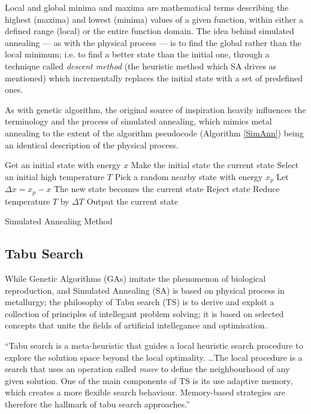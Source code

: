 Local and global minima and maxima are mathematical terms describing the highest (maxima) and lowest (minima) values of a given function, within either a defined range (local) or the entire function domain. The idea behind simulated annealing --- as with the physical process --- is to find the global rather than the local minimum; i.e. to find a better state than the initial one, through a technique called \emph{descent method} (the heuristic method which SA drives as mentioned)  which incrementally replaces the initial state with a set of predefined ones.

As with genetic algorithm, the original source of inspiration heavily influences the terminology and the process of simulated annealing, which mimics metal annealing to the extent of the algorithm pseudocode (Algorithm \ref{SimAnn}) being an identical description of the physical process.

\begin{algorithm}
\begin{algorithmic}[1]
\State Get an initial state with energy $x$
\State Make the initial state the current state
\State Select an initial high temperature $T$
		\State Pick a random nearby state with energy $x_p$
		\State Let $\Delta x = x_p - x$
			\State The new state becomes the current state
		\Else
			\State Reject state
		\EndIf
	\EndWhile
	\State Reduce temperature $T$ by $\Delta T$
\EndWhile
\State Output the current state
\end{algorithmic}
\caption{Simulated Annealing Method \cite{lam88}}
\label{SimAnn}
\end{algorithm}

\clearpage
\subsection{Tabu Search}

While Genetic Algorithms (GAs) imitate the phenomenon of biological reproduction, and Simulated Annealing (SA) is based on physical process in metallurgy; the philosophy of Tabu search (TS) is to derive and exploit a collection of principles of intellegant problem solving; it is based on selected concepts that unite the fields of artificial intellegance and optimisation. \cite{glover97}

``Tabu search is a meta-heuristic that guides a local heuristic search procedure to explore the solution space beyond the local optimality. \ldots The local procedure is a search that uses an operation called \emph{move} to define the neighbourhood of any given solution. One of the main components of TS is its use adaptive memory, which creates a more flexible search behaviour. Memory-based strategies are therefore the hallmark of tabu search approaches.'' \cite{glover97}


